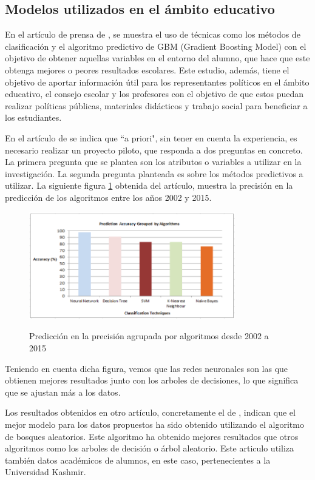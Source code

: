 \subsection{Modelos utilizados en el ámbito educativo}
En el artículo de prensa de , se muestra el uso de técnicas como los métodos de clasificación y el algoritmo predictivo de GBM (Gradient Boosting Model) con el objetivo de obtener aquellas variables en el entorno del alumno, que hace que este obtenga mejores o peores resultados escolares. Este estudio, además, tiene el objetivo de aportar información útil para los representantes políticos en el ámbito educativo, el consejo escolar y los profesores con el objetivo de que estos puedan realizar políticas públicas, materiales didácticos y trabajo social para beneficiar a los estudiantes.

En el artículo de \cite{SHAHIRI2015414} se indica que ``a priori", sin tener en cuenta la experiencia, es necesario realizar un proyecto piloto, que responda a dos preguntas en concreto. La primera pregunta que se plantea son los atributos o variables a utilizar en la investigación. La segunda pregunta planteada es sobre los métodos predictivos a utilizar. La siguiente figura \ref{fig:precMet} obtenida del artículo, muestra la precisión en la predicción de los algoritmos entre los años 2002 y 2015.

\begin{figure}[htb]
	\centering
	\caption{Predicción en la precisión agrupada por algoritmos desde 2002 a 2015}
	\includegraphics[width=0.8\textwidth]{recursos/PrecisionMetodos}
	\label{fig:precMet}
\end{figure}

Teniendo en cuenta dicha figura, vemos que las redes neuronales son las que obtienen mejores resultados junto con los arboles de decisiones, lo que significa que se ajustan más a los datos. 

Los resultados obtenidos en otro artículo, concretamente el de , indican que el mejor modelo para los datos propuestos ha sido obtenido utilizando el algoritmo de bosques aleatorios. Este algoritmo ha obtenido mejores resultados que otros algoritmos como los arboles de decisión o árbol aleatorio. Este articulo utiliza también datos académicos de alumnos, en este caso, pertenecientes a la Universidad Kashmir.

